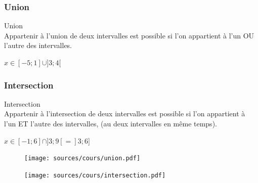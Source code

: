 \documentclass[paper=a4, fontsize=9pt]{scrartcl} %
\begin{document}
\begin{multicols}{2}
  \subsubsection{Union}
  \begin{Definition}{Union}\\
    Appartenir à l'union de deux intervalles est possible si l'on appartient à l'un OU l'autre des intervalles.
  \end{Definition}
  $x \in [-5 ; 1 ] \cup ] 3 ; 4[$\\

  \subsubsection{Intersection}
  \begin{Definition}{Intersection}\\
    Appartenir à l'intersection de deux intervalles est possible si l'on appartient à l'un ET l'autre des intervalles, (au deux intervalles en même temps).
  \end{Definition}

  $x \in [-1 ; 6 ] \cap ] 3 ; 9[ = ]3 ; 6]$

\end{multicols}

\begin{multicols}{2}
  \begin{figure}[H]
    \centering
    \texttt{[image: sources/cours/union.pdf]}
  \end{figure}

  \begin{figure}[H]
    \centering
    \texttt{[image: sources/cours/intersection.pdf]}
  \end{figure}

\end{multicols}
\end{document}
